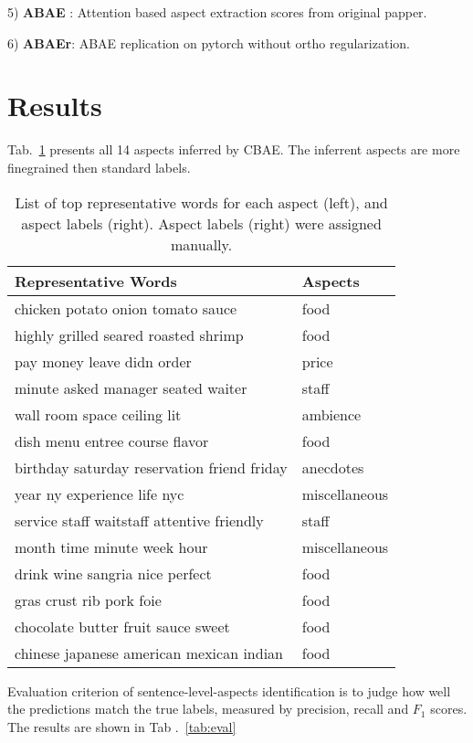 \documentclass{article}
\begin{document}
5) \textbf{ABAE} \cite{He2018ABAE}: Attention based aspect extraction scores from original papper.

6) \textbf{ABAEr}: ABAE replication on pytorch without ortho regularization.


\section{Results}
Tab.~\ref{tab:aspects} presents all 14 aspects inferred by CBAE. The inferrent aspects are more finegrained then standard labels.

\begin{table}[tbh!]
\begin{center}
\begin{tabular}[t]{l|l}
\hline
Representative Words & Aspects \\
\hline
chicken potato onion tomato sauce & food  \\
highly grilled seared roasted shrimp & food  \\
pay money leave didn order & price  \\
minute asked manager seated waiter & staff  \\
wall room space ceiling lit & ambience  \\
dish menu entree course flavor & food  \\
birthday saturday reservation friend friday & anecdotes  \\
year ny experience life nyc & miscellaneous  \\
service staff waitstaff attentive friendly & staff  \\
month time minute week hour & miscellaneous  \\
drink wine sangria nice perfect & food  \\
gras crust rib pork foie & food  \\
chocolate butter fruit sauce sweet & food  \\
chinese japanese american mexican indian & food  \\
\hline
\end{tabular}
\caption{List of top representative words for each aspect (left), and aspect labels (right). Aspect labels (right) were assigned manually.}
\label{tab:aspects}
\end{center}
\end{table}

Evaluation criterion of sentence-level-aspects identification is to judge how well the predictions match the true labels, measured by precision, recall and $F_1$ scores. The results are shown in Tab .~\ref{tab:eval}
\end{document}
